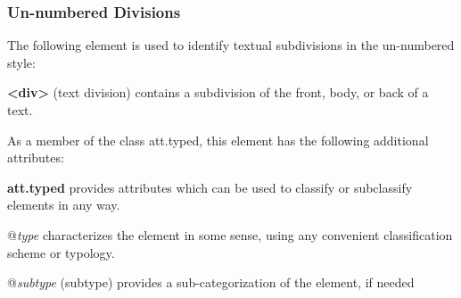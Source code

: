 \subsubsection[{Un-numbered Divisions}]{Un-numbered Divisions}\label{DSDIV1}\par
The following element is used to identify textual subdivisions in the un-numbered style: 
\begin{sansreflist}
  
\item [\textbf{<div>}] (text division) contains a subdivision of the front, body, or back of a text.
\end{sansreflist}
 As a member of the class \textsf{att.typed}, this element has the following additional attributes: 
\begin{sansreflist}
  
\item [\textbf{att.typed}] provides attributes which can be used to classify or subclassify elements in any way.\hfil\\[-10pt]\begin{sansreflist}
    \item[@{\itshape type}]
  characterizes the element in some sense, using any convenient classification scheme or typology.
    \item[@{\itshape subtype}]
  (subtype) provides a sub-categorization of the element, if needed
\end{sansreflist}  
\end{sansreflist}
\par

